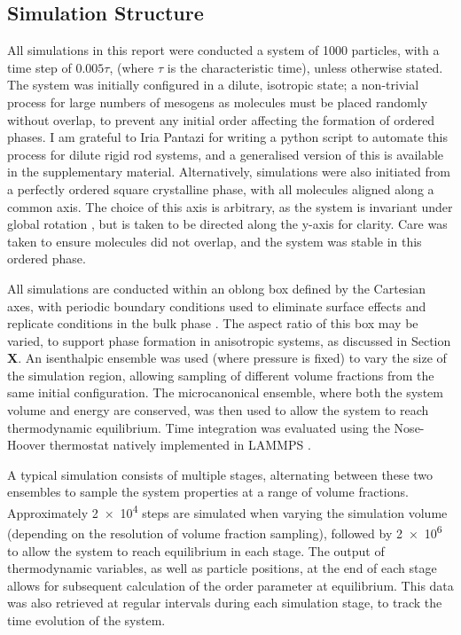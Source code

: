\documentclass[11pt, a4paper]{article} %
\begin{document}
\subsection{Simulation Structure} %
All simulations in this report were conducted a system of 1000 particles, with a time step of $0.005\tau$, (where $\tau$ is the characteristic time), unless otherwise stated. The system was initially configured in a dilute, isotropic state; a non-trivial process for large numbers of mesogens as molecules must be placed randomly without overlap, to prevent any initial order affecting the formation of ordered phases. I am grateful to Iria Pantazi for writing a python script to automate this process for dilute rigid rod systems, and a generalised version of this is available in the supplementary material. Alternatively, simulations were also initiated from a perfectly ordered square crystalline phase, with all molecules aligned along a common axis. The choice of this axis is arbitrary, as the system is invariant under global rotation \cite{Nos1983}, but is taken to be directed along the y-axis for clarity. Care was taken to ensure molecules did not overlap, and the system was stable in this ordered phase.

All simulations are conducted within an oblong box defined by the Cartesian axes, with periodic boundary conditions used to eliminate surface effects and replicate conditions in the bulk phase \cite{Frenkel2002}. The aspect ratio of this box may be varied, to support phase formation in anisotropic systems, as discussed in Section \textbf{X}. An isenthalpic ensemble was used (where pressure is fixed) to vary the size of the simulation region, allowing sampling of different volume fractions from the same initial configuration. The  microcanonical ensemble, where both the system volume and energy are conserved, was then used to allow the system to reach thermodynamic equilibrium. Time integration was evaluated using the Nose-Hoover thermostat \cite{Nos1984, Hoover1985} natively implemented in LAMMPS \cite{Shinoda2004}.

A typical simulation consists of multiple stages, alternating between these two ensembles to sample the system properties at a range of volume fractions. Approximately \num{2e4} steps are simulated when varying the simulation volume (depending on the resolution of volume fraction sampling), followed by \num{2e6} to allow the system to reach equilibrium in each stage. The output of thermodynamic variables, as well as particle positions, at the end of each stage allows for subsequent calculation of the order parameter at equilibrium. This data was also retrieved at regular intervals during each simulation stage, to track the time evolution of the system.
\end{document}

